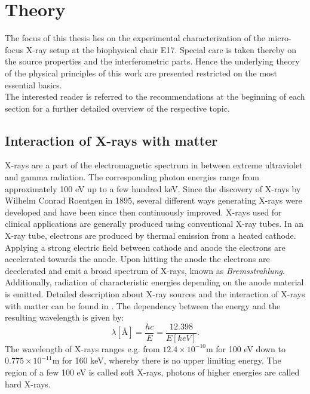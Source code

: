 \chapter{Theory}\label{chap:th}
The focus of this thesis lies on the experimental characterization of the micro-focus X-ray setup at the biophysical chair E17. Special care is taken thereby on the source properties and the interferometric parts. 
Hence the underlying theory of the physical principles of this work are presented restricted on the most essential basics.\\
The interested reader is referred to the recommendations at the beginning of each section for a further detailed overview of the respective topic.
\section{Interaction of X-rays with matter}\label{sec:ixm}
{X-rays are a part of the electromagnetic spectrum in between extreme ultraviolet and gamma radiation. The corresponding photon energies range from approximately 100 eV up to a few hundred keV. Since the discovery of X-rays by Wilhelm Conrad Roentgen in 1895, several different ways generating X-rays were developed 
and have been since then continuously improved.
X-rays used for clinical applications are generally produced using conventional X-ray tubes. In an X-ray tube, electrons are produced by thermal emission from a heated cathode. Applying a strong electric field between cathode and anode the electrons are accelerated towards the anode. Upon hitting the anode the electrons are decelerated and emit a broad spectrum of X-rays, known as \textit{Bremsstrahlung}. Additionally, radiation of characteristic energies depending on the anode material is emitted. Detailed description about X-ray sources and the interaction of X-rays with matter can be found in \cite{Veen2004,Als-nielsen}. The dependency between the energy and the resulting wavelength is given by:
\begin{equation}
\lambda \left[\text{\AA} \right] = \frac{hc}{E}=\frac{12.398}{E \left[keV \right]}.
\end{equation}\label{lEdep}
The wavelength of X-rays ranges e.g. from $12.4 \times 10^{-10}$m for 100 eV down to $0.775 \times 10^{-11}$m for 160 keV, whereby there is no upper limiting energy. The region of a few 100 eV is called soft X-rays, photons of higher energies are called hard X-rays.}          
